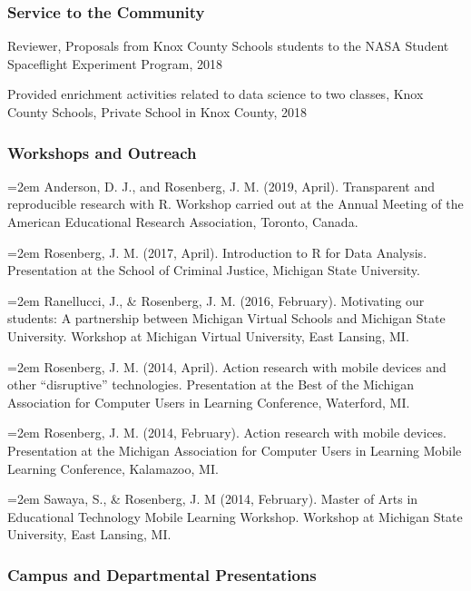 \documentclass[14,]{article}
\begin{document}
\subsubsection{Service to the
Community}\label{service-to-the-community-1}

Reviewer, Proposals from Knox County Schools students to the NASA
Student Spaceflight Experiment Program, 2018

Provided enrichment activities related to data science to two classes,
Knox County Schools, Private School in Knox County, 2018

\subsubsection{Workshops and Outreach}\label{workshops-and-outreach}

\hangindent=2em Anderson, D. J., and Rosenberg, J. M. (2019, April).
Transparent and reproducible research with R. Workshop carried out at
the Annual Meeting of the American Educational Research Association,
Toronto, Canada.

\hangindent=2em Rosenberg, J. M. (2017, April). Introduction to R for
Data Analysis. Presentation at the School of Criminal Justice, Michigan
State University.

\hangindent=2em Ranellucci, J., \& Rosenberg, J. M. (2016, February).
Motivating our students: A partnership between Michigan Virtual Schools
and Michigan State University. Workshop at Michigan Virtual University,
East Lansing, MI.

\hangindent=2em Rosenberg, J. M. (2014, April). Action research with
mobile devices and other ``disruptive'' technologies. Presentation at
the Best of the Michigan Association for Computer Users in Learning
Conference, Waterford, MI.

\hangindent=2em Rosenberg, J. M. (2014, February). Action research with
mobile devices. Presentation at the Michigan Association for Computer
Users in Learning Mobile Learning Conference, Kalamazoo, MI.

\hangindent=2em Sawaya, S., \& Rosenberg, J. M (2014, February). Master
of Arts in Educational Technology Mobile Learning Workshop. Workshop at
Michigan State University, East Lansing, MI.

\subsubsection{Campus and Departmental
Presentations}\label{campus-and-departmental-presentations}
\end{document}
